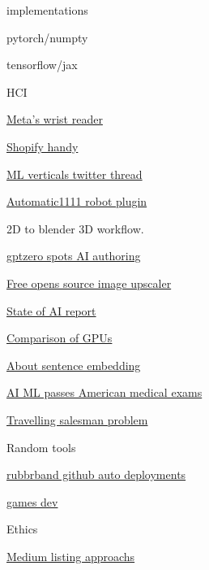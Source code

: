       implementations

       
      \tightlist
       
        pytorch/numpty
       
        tensorflow/jax
       
     
      HCI

       
      \tightlist
       
        \href{https://www.from-the-interface.com/wrist-interfaces/}{Meta's
        wrist reader}
       
        \href{https://github.com/Shopify/handy}{Shopify handy}
       
     
      \href{https://twitter.com/daniel_eckler/status/1564601398284664832?s=20\&t=79zgNMrzbD89cQto2u5j-Q}{ML
      verticals twitter thread}
     
      \href{https://github.com/AUTOMATIC1111/stable-diffusion-webui/wiki/Developing-extensions}{Automatic1111
      robot plugin}
     
      2D to blender 3D workflow.
     
      \href{http://gptzero.me/}{gptzero spots AI authoring}
     
      \href{https://upscayl.github.io/}{Free opens source image
      upscaler}
     
      \href{https://www.stateof.ai/}{State of AI report}
     
      \href{https://timdettmers.com/2023/01/16/which-gpu-for-deep-learning/}{Comparison
      of GPUs}
     
      \href{https://txt.cohere.ai/sentence-word-embeddings/}{About
      sentence embedding}
     
      \href{https://www.medpagetoday.com/special-reports/exclusives/102705}{AI
      ML passes American medical exams}
     
      \href{https://github.com/diego-vicente/som-tsp}{Travelling
      salesman problem}
     
   
    Random tools

     
    \tightlist
     
      \href{https://rubbrband.com/}{rubbrband github auto deployments}
     
      \href{https://www.traffickinggame.com/ai-assisted-graphics/}{games
      dev}
     
   
    Ethics

     
    \tightlist
     
      \href{https://blog.medium.com/how-were-approaching-ai-generated-writing-on-medium-16ee8cb3bc89}{Medium
      listing approachs}
     
